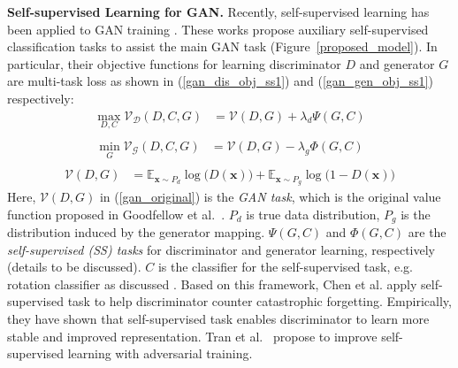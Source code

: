 \documentclass{article}
\begin{document}
{\bf Self-supervised Learning for GAN.}
Recently, self-supervised learning has been applied to GAN training
\cite{chen-arxiv-2018,tran-arxiv-2019}.  These works propose 
auxiliary 
self-supervised classification tasks to assist the main GAN task (Figure~\ref{proposed_model}).
In particular, their objective functions for learning discriminator $D$ and 
generator $G$  are 
multi-task loss as shown in (\ref{gan_dis_obj_ss1}) and (\ref{gan_gen_obj_ss1}) respectively:
\begin{equation}
\begin{split}
\max_{D,C}\mathcal{V_D}(D,C,G) &= \mathcal{V}(D,G) + \lambda_d {\Psi(G,C)} \\
\end{split}
\label{gan_dis_obj_ss1}
\end{equation}
\vspace{-0.5cm}
\begin{equation}
\begin{split}
\min_G\mathcal{V_G}(D,C,G) &= \mathcal{V}(D,G) - \lambda_g {\Phi(G,C)} \\
\end{split}
\label{gan_gen_obj_ss1}
\end{equation}
\vspace{-0.5cm}
\begin{equation}
\begin{split}
\mathcal{V}(D,G) &=  \mathbb{E}_{\mathbf{x} \sim {P_d}}\log \Big(D(\mathbf{x})\Big)   + \mathbb{E}_{\mathbf{x} \sim {P_g}}\log \Big(1-D(\mathbf{x})\Big)
\end{split}
\label{gan_original}
\end{equation}
Here, $\mathcal{V}(D,G)$ in (\ref{gan_original}) is the {\em GAN task}, which is the original value function proposed in Goodfellow et al.~\cite{goodfellow-nisp-2014}.
$P_d$ is true data distribution, $P_g$ is the distribution induced by the generator mapping.
$\Psi(G,C)$ and $\Phi(G,C)$ are the {\em self-supervised (SS) tasks} for discriminator and generator learning, respectively (details to be discussed). $C$ is the classifier for the self-supervised task, e.g. rotation classifier 
as discussed \cite{gidaris-iclr-2018}.
Based on this framework, Chen et al.\cite{chen-arxiv-2018} apply self-supervised task to help discriminator counter catastrophic forgetting. Empirically, they have shown that self-supervised task enables discriminator to learn more stable and improved representation. Tran et al.~\cite{tran-arxiv-2019} propose to improve self-supervised learning with adversarial training. 
\end{document}
